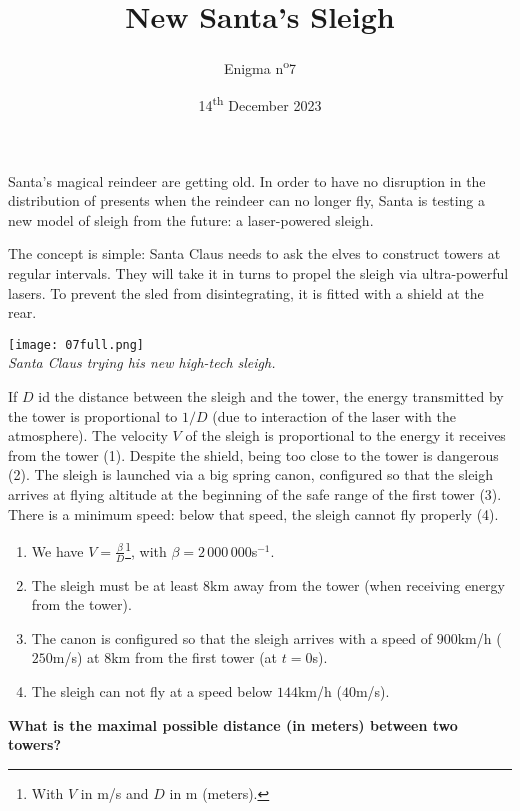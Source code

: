 \documentclass[a4paper, top=10mm]{article}
\title{\textbf{\huge{New Santa's Sleigh}}}
\author{Enigma n\textsuperscript{o}7}
\date{14\textsuperscript{th} December 2023}
\begin{document}
	\maketitle
	
	Santa's magical reindeer are getting old.
	In order to have no disruption in the distribution of presents when the reindeer can no longer fly, Santa is testing a new model of sleigh from the future: a laser-powered sleigh.
	
	The concept is simple: Santa Claus needs to ask the elves to construct towers at regular intervals.
	They will take it in turns to propel the sleigh via ultra-powerful lasers.
	To prevent the sled from disintegrating, it is fitted with a shield at the rear.
	
	\begin{center}
		\texttt{[image: 07full.png]}\\
		\textit{Santa Claus trying his new high-tech sleigh.}
	\end{center}
	
	If $D$ id the distance between the sleigh and the tower, the energy transmitted by the tower is proportional to $1/D$ (due to interaction of the laser with the atmosphere).
	The velocity $V$ of the sleigh is proportional to the energy it receives from the tower (1).
	Despite the shield, being too close to the tower is dangerous (2).
	The sleigh is launched via a big spring canon, configured so that the sleigh arrives at flying altitude at the beginning of the safe range of the first tower (3).
	There is a minimum speed: below that speed, the sleigh cannot fly properly (4).
	
	\begin{enumerate}
		\item We have $V = \frac{\beta}{D}$\footnote{With $V$ in m/s and $D$ in m (meters).}, with $\beta=2\,000\,000$s$ ^{-1}$.
		\item The sleigh must be at least $8$km away from the tower (when receiving energy from the tower).
		\item The canon is configured so that the sleigh arrives with a speed of $900$km/h ($250$m/s) at $8$km from the first tower (at $t=0$s).
		\item The sleigh can not fly at a speed below $144$km/h ($40$m/s).
	\end{enumerate}
	
	\textbf{What is the maximal possible distance (in meters) between two towers?}
	
	
	
	


	
\end{document}
